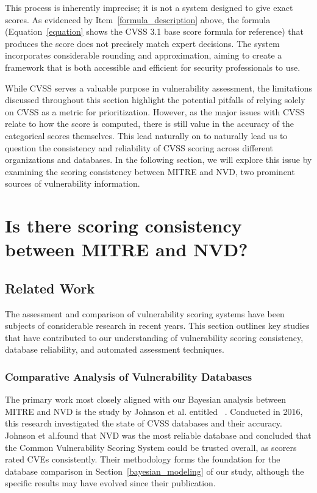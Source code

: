 \documentclass[12pt]{article}
\begin{document}
This process is inherently imprecise; it is not a system designed to give exact scores. As evidenced
by Item~\ref{formula_description} above, the formula (Equation~\ref{equation} shows the CVSS 3.1
base score formula for reference) that produces the score does not precisely match expert decisions.
The system incorporates considerable rounding and approximation, aiming to create a framework that
is both accessible and efficient for security professionals to use.

While CVSS serves a valuable purpose in vulnerability assessment, the limitations discussed
throughout this section highlight the potential pitfalls of relying solely on CVSS as a metric for
prioritization. However, as the major issues with CVSS relate to how the score is computed, there is
still value in the accuracy of the categorical scores themselves. This lead naturally on to
naturally lead us to question the consistency and reliability of CVSS scoring across different
organizations and databases. In the following section, we will explore this issue by examining the
scoring consistency between MITRE and NVD, two prominent sources of vulnerability information.

\section{Is there scoring consistency between MITRE and NVD?}

\subsection{Related Work}

The assessment and comparison of vulnerability scoring systems have been subjects of considerable
research in recent years. This section outlines key studies that have contributed to our
understanding of vulnerability scoring consistency, database reliability, and automated assessment
techniques.

\subsubsection{Comparative Analysis of Vulnerability Databases}

The primary work most closely aligned with our Bayesian analysis between MITRE and NVD is the study
by Johnson et al. entitled ~\cite{bayes}. Conducted in 2016, this research investigated the state of CVSS databases
and their accuracy. Johnson et al.\@ found that NVD was the most reliable database and concluded
that the Common Vulnerability Scoring System could be trusted overall, as scorers rated CVEs
consistently. Their methodology forms the foundation for the database comparison in
Section~\ref{bayesian_modeling} of our study, although the specific results may have evolved since
their publication.
\end{document}
